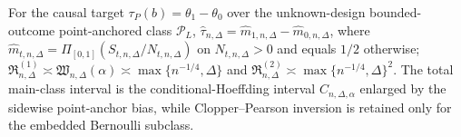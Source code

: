 For the causal target \(\tau_P(b)=\theta_1-\theta_0\) over the unknown-design bounded-outcome point-anchored class \(\mathcal P_L\), \(\widehat\tau_{n,\Delta}=\widehat m_{1,n,\Delta}-\widehat m_{0,n,\Delta}\), where \(\widehat m_{t,n,\Delta}=\Pi_{[0,1]}(S_{t,n,\Delta}/N_{t,n,\Delta})\) on \(N_{t,n,\Delta}>0\) and equals \(1/2\) otherwise; \(\mathfrak R^{(1)}_{n,\Delta}\asymp\mathfrak W_{n,\Delta}(\alpha)\asymp\max\{n^{-1/4},\Delta\}\) and \(\mathfrak R^{(2)}_{n,\Delta}\asymp\max\{n^{-1/4},\Delta\}^2\).  The total main-class interval is the conditional-Hoeffding interval \(C_{n,\Delta,\alpha}\) enlarged by the sidewise point-anchor bias, while Clopper--Pearson inversion is retained only for the embedded Bernoulli subclass.